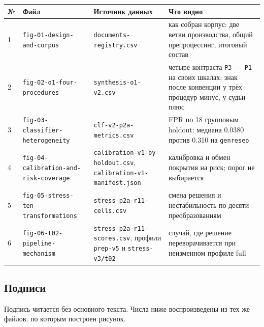 \documentclass[11pt,a4paper]{article}
\renewcommand{\_}{\textunderscore\allowbreak}
\begin{document}
\begin{center}
\small
\begin{tabularx}{\textwidth}{llXX}
\toprule
№ & Файл & Источник данных & Что видно \\
\midrule
1 & \texttt{fig-\allowbreak{}01-\allowbreak{}design-\allowbreak{}and-\allowbreak{}corpus} & \texttt{documents-\allowbreak{}registry.csv} & как собран корпус: две ветви производства, общий препроцессинг, итоговый состав \\
2 & \texttt{fig-\allowbreak{}02-\allowbreak{}o1-\allowbreak{}four-\allowbreak{}procedures} & \texttt{synthesis-\allowbreak{}o1-\allowbreak{}v2.csv} & четыре контраста \texttt{P3 $-$ P1} на своих шкалах; знак после конвенции у трёх процедур минус, у судьи плюс \\
3 & \texttt{fig-\allowbreak{}03-\allowbreak{}classifier-\allowbreak{}heterogeneity} & \texttt{clf-\allowbreak{}v2-\allowbreak{}p2a-\allowbreak{}metrics.csv} & FPR по 18 групповым holdout: медиана 0.0380 против 0.310 на \texttt{genre\_seo} \\
4 & \texttt{fig-\allowbreak{}04-\allowbreak{}calibration-\allowbreak{}and-\allowbreak{}risk-\allowbreak{}coverage} & \texttt{calibration-\allowbreak{}v1-\allowbreak{}by-\allowbreak{}holdout.csv}, \texttt{calibration-\allowbreak{}v1-\allowbreak{}manifest.json} & калибровка и обмен покрытия на риск; порог не выбирается \\
5 & \texttt{fig-\allowbreak{}05-\allowbreak{}stress-\allowbreak{}ten-\allowbreak{}transformations} & \texttt{stress-\allowbreak{}p2a-\allowbreak{}r11-\allowbreak{}cells.csv} & смена решения и нестабильность по десяти преобразованиям \\
6 & \texttt{fig-\allowbreak{}06-\allowbreak{}t02-\allowbreak{}pipeline-\allowbreak{}mechanism} & \texttt{stress-\allowbreak{}p2a-\allowbreak{}r11-\allowbreak{}scores.csv}, профили \texttt{prep-\allowbreak{}v5} и \texttt{stress-\allowbreak{}v3/t02} & случай, где решение переворачивается при неизменном профиле full \\
\bottomrule
\end{tabularx}
\end{center}

\subsection{Подписи}

Подпись читается без основного текста. Числа ниже воспроизведены из тех же файлов,
по которым построен рисунок.
\end{document}
